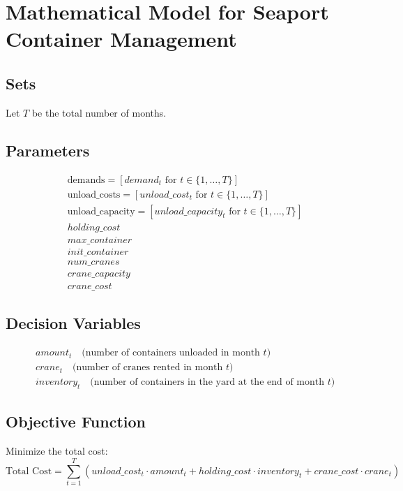 \documentclass{article}
\begin{document}
\section*{Mathematical Model for Seaport Container Management}

\subsection*{Sets}
Let \( T \) be the total number of months.

\subsection*{Parameters}
\begin{align*}
& \text{demands} = [demand_{t} \text{ for } t \in \{1, \dots, T\}] \\
& \text{unload\_costs} = [unload\_cost_{t} \text{ for } t \in \{1, \dots, T\}] \\
& \text{unload\_capacity} = [unload\_capacity_{t} \text{ for } t \in \{1, \dots, T\}] \\
& holding\_cost \\
& max\_container \\
& init\_container \\
& num\_cranes \\
& crane\_capacity \\
& crane\_cost
\end{align*}

\subsection*{Decision Variables}
\begin{align*}
& amount_{t} \quad \text{(number of containers unloaded in month } t\text{)} \\
& crane_{t} \quad \text{(number of cranes rented in month } t\text{)} \\
& inventory_{t} \quad \text{(number of containers in the yard at the end of month } t\text{)}
\end{align*}

\subsection*{Objective Function}
Minimize the total cost:
\[
\text{Total Cost} = \sum_{t=1}^{T} \left( unload\_cost_{t} \cdot amount_{t} + holding\_cost \cdot inventory_{t} + crane\_cost \cdot crane_{t} \right)
\]
\end{document}
